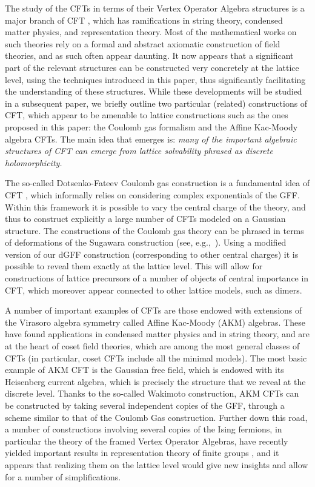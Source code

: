 \documentclass[12pt,oneside,english]{amsart}
\numberwithin{equation}{section}
\numberwithin{figure}{section}
\theoremstyle{plain}
\theoremstyle{plain}
\theoremstyle{plain}
\theoremstyle{plain}
\theoremstyle{remark}
\theoremstyle{definition}
\theoremstyle{plain}
\theoremstyle{plain}
\numberwithin{thm}{section}
\begin{document}
The study of the CFTs in terms of their Vertex Operator Algebra structures
is a major branch of CFT \cite{frenkel-lepwosky-meurman}, which has
ramifications in string theory, condensed matter physics, and representation
theory. Most of the mathematical works on such theories rely on a
formal and abstract axiomatic construction of field theories, and
as such often appear daunting. It now appears that a significant part
of the relevant structures can be constructed very concretely at the
lattice level, using the techniques introduced in this paper, thus
significantly facilitating the understanding of these structures.
While these developments will be studied in a subsequent paper, we
briefly outline two particular (related) constructions of CFT, which
appear to be amenable to lattice constructions such as the ones proposed
in this paper: the Coulomb gas formalism and the Affine Kac-Moody
algebra CFTs. The main idea that emerges is: \emph{many of the important
algebraic structures of CFT can emerge from lattice solvability phrased
as discrete holomorphicity.}

The so-called Dotsenko-Fateev Coulomb gas construction is a fundamental
idea of CFT 
\cite{dotsenko-fateev,Felder-BRST_approach,di-francesco-mathieu-senechal},
which informally relies on considering complex exponentials of the
GFF. Within this framework it is possible to vary the central charge
of the theory, and thus to construct explicitly a large number of
CFTs modeled on a Gaussian structure. The constructions of the Coulomb
gas theory can be phrased in terms of deformations of the Sugawara
construction (see, e.g.,~\cite{Felder-BRST_approach,kang-makarov,mickelsson}). 
Using a modified
version of our dGFF construction (corresponding to other central charges)
it is possible to reveal them exactly at the lattice level. This will
allow for constructions of lattice precursors of a number of objects
of central importance in CFT, which moreover appear connected to other
lattice models, such as dimers.

A number of important examples of CFTs are those endowed with extensions
of the Virasoro algebra symmetry called Affine Kac-Moody (AKM) algebras.
These have found applications in condensed matter physics and in string
theory, and are at the heart of coset field theories, which are among
the most general classes of CFTs (in particular, coset CFTs include
all the minimal models). The most basic example of AKM CFT is the
Gaussian free field, which is endowed with its Heisenberg current
algebra, which is precisely the structure that we reveal at the discrete
level. Thanks to the so-called Wakimoto construction, AKM CFTs can
be constructed by taking several independent copies of the GFF, through
a scheme similar to that of the Coulomb Gas construction. Further
down this road, a number of constructions involving several copies
of the Ising fermions, in particular the theory of the framed Vertex
Operator Algebras, have recently yielded important results in representation
theory of finite groups \cite{miyamoto}, and it appears that realizing
them on the lattice level would give new insights and allow for a
number of simplifications.
\end{document}
